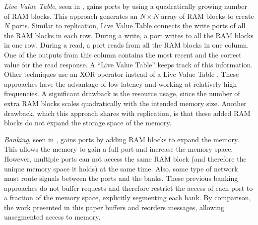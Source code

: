 {\em Live Value Table}, seen in \cite{f-scratch:laforest,f-scratch:anjam,f-scratch:abdelhadi}, gains ports by using a quadratically growing number of RAM blocks. This approach generates an $N \times N$ array of RAM blocks to create $N$ ports. Similar to replication, Live Value Table connects the write ports of all the RAM blocks in each row. During a write, a port writes to all the RAM blocks in one row. During a read, a port reads from all the RAM blocks in one column. One of the outputs from this column contains the most recent and the correct value for the read response. A ``Live Value Table'' keeps track of this information. Other techniques use an XOR operator instead of a Live Value Table \cite{f-scratch:laforest2}. These approaches have the advantage of low latency and working at relatively high frequencies. A significant drawback is the resource usage, since the number of extra RAM blocks scales quadratically with the intended memory size. Another drawback, which this approach shares with replication, is that these added RAM blocks do not expand the storage space of the memory.

{\em Banking}, seen in \cite{f-scratch:moscola,f-scratch:saghir,f-scratch:saghir2}, gains ports by adding RAM blocks to expand the memory. This allows the memory to gain a full port and increase the memory space. However, multiple ports can not access the same RAM block (and therefore the unique memory space it holds) at the same time. Also, some type of network must route signals between the ports and the banks. These previous banking approaches do not buffer requests and therefore restrict the access of each port to a fraction of the memory space, explicitly segmenting each bank. By comparison, the work presented in this paper buffers and reorders messages, allowing unsegmented access to memory.


